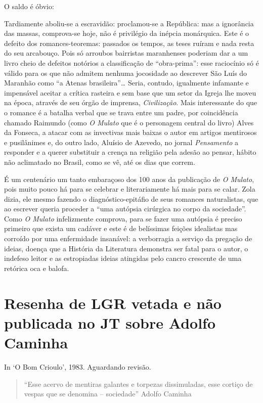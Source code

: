 \documentclass[
  letterpaper,
  DIV=11,
  numbers=noendperiod]{scrreprt}
\begin{document}
O saldo é óbvio:

Tardiamente aboliu-se a escravidão: proclamou-se a República: mas a
ignorância das massas, comprova-se hoje, não é privilégio da inépcia
monárquica. Este é o defeito dos romances-teoremas: passados os tempos,
as teses ruíram e nada resta do seu arcabouço. Pois só arroubos
bairristas maranhenses poderiam dar a um livro cheio de defeitos
notórios a classificação de ``obra-prima'': esse raciocínio só é válido
para os que não admitem nenhuma jocosidade ao descrever São Luís do
Maranhão como ``a Atenas brasileira''\ldots{} Seria, contudo, igualmente
infamante e impensável aceitar a crítica rasteira e sem base que um
setor da Igreja lhe moveu na época, através de seu órgão de imprensa,
\emph{Civilização}. Mais interessante do que o romance é a batalha
verbal que se trava entre um padre, por coincidência chamado Raimundo
(como \emph{O Mulato} que é o personagem central do livro) Alves da
Fonseca, a atacar com as invectivas mais baixas o autor em artigos
mentirosos e pusilânimes e, do outro lado, Aluísio de Azevedo, no jornal
\emph{Pensamento} a responder e a querer substituir a crença na religião
pela adesão ao pensar, hábito não aclimatado no Brasil, como se vê, até
os dias que correm.

É um centenário um tanto embaraçoso dos 100 anos da publicação de
\emph{O Mulato}, pois muito pouco há para se celebrar e literariamente
há mais para se calar. Zola dizia, ele mesmo fazendo o
diagnóstico-epitáfio de seus romances naturalistas, que ao escrever
queria proceder a ``uma autópsia cirúrgica no corpo da sociedade''. Como
\emph{O Mulato} infelizmente comprova, para se fazer uma autópsia é
preciso primeiro que exista um cadáver e este é de belíssimas feições
idealistas mas corroído por uma enfermidade insanável: a verborragia a
serviço da pregação de ideias, doença que a História da Literatura
demonstra ser fatal para o autor, o indefeso leitor e as estropiadas
ideias atingidas pelo cancro crescente de uma retórica oca e balofa.

\chapter{Resenha de LGR vetada e não publicada no JT sobre Adolfo
Caminha}\label{resenha-de-lgr-vetada-e-nuxe3o-publicada-no-jt-sobre-adolfo-caminha}

In `O Bom Crioulo', 1983. Aguardando revisão.

\hfill\break

\begin{quote}
``Esse acervo de mentiras galantes e torpezas dissimuladas, esse cortiço
de vespas que se denomina -- sociedade'' Adolfo Caminha
\end{quote}
\end{document}
